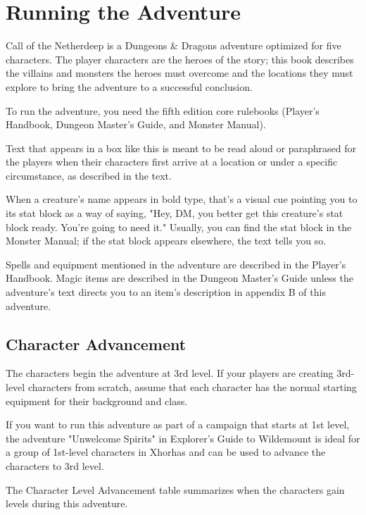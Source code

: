 \documentclass[10pt,a4paper,twoside,bg=print,twocolumn,openany,nodeprecatedcode]{dndbook}
\begin{document}
\section{Running the Adventure}
Call of the Netherdeep is a Dungeons \& Dragons adventure optimized for five characters. The player characters are the heroes of the story; this book describes the villains and monsters the heroes must overcome and the locations they must explore to bring the adventure to a successful conclusion.

To run the adventure, you need the fifth edition core rulebooks (Player's Handbook, Dungeon Master's Guide, and Monster Manual).

\begin{DndReadAloud}{}
Text that appears in a box like this is meant to be read aloud or paraphrased for the players when their characters first arrive at a location or under a specific circumstance, as described in the text.

\end{DndReadAloud}

When a creature's name appears in bold type, that's a visual cue pointing you to its stat block as a way of saying, "Hey, DM, you better get this creature's stat block ready. You're going to need it." Usually, you can find the stat block in the Monster Manual; if the stat block appears elsewhere, the text tells you so.

Spells and equipment mentioned in the adventure are described in the Player's Handbook. Magic items are described in the Dungeon Master's Guide unless the adventure's text directs you to an item's description in appendix B of this adventure.

\subsection{Character Advancement}
The characters begin the adventure at 3rd level. If your players are creating 3rd-level characters from scratch, assume that each character has the normal starting equipment for their background and class.

If you want to run this adventure as part of a campaign that starts at 1st level, the adventure "Unwelcome Spirits" in Explorer's Guide to Wildemount is ideal for a group of 1st-level characters in Xhorhas and can be used to advance the characters to 3rd level.

The Character Level Advancement table summarizes when the characters gain levels during this adventure.
\end{document}
